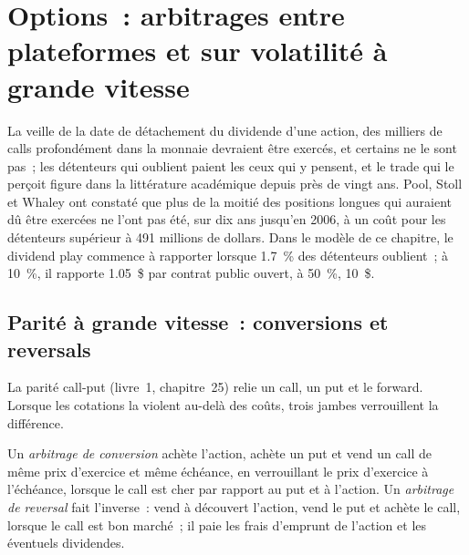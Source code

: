 \chapter{Options~: arbitrages entre plateformes et sur volatilité à grande vitesse}\label{ch:hf:options-cross-venue-and-volatility-arbitrage-at-speed}

La veille de la date de détachement du dividende d'une action, des milliers de calls profondément dans la monnaie devraient être exercés, et certains ne le sont pas~; les détenteurs qui oublient paient les
ceux qui y pensent, et le trade qui le perçoit figure dans la littérature académique depuis près de vingt ans. Pool, Stoll et Whaley ont constaté
que plus de la moitié des positions longues qui auraient dû être exercées ne l'ont pas été, sur dix ans jusqu'en 2006, à un coût pour les détenteurs supérieur à 491
millions de dollars. Dans le modèle de ce chapitre, le dividend play commence à rapporter lorsque 1.7~\% des détenteurs oublient~; à 10~\%, il rapporte 1.05~\$ par contrat public ouvert,
à 50~\%, 10~\$.

\section{Parité à grande vitesse~: conversions et reversals}

La parité call-put (livre~1, chapitre~25) relie un call, un put et le forward. Lorsque les cotations la violent au-delà des coûts, trois jambes verrouillent la différence.

\begin{definition}\label{def:hf:options-cross-venue-and-volatility-arbitrage-at-speed:conversion}
Un \emph{arbitrage de conversion} achète l'action, achète un put et vend un call de même prix d'exercice et même échéance, en verrouillant le
prix d'exercice à l'échéance, lorsque le call est cher par rapport au put et à l'action. Un \emph{arbitrage de reversal} fait l'inverse~:
vend à découvert l'action, vend le put et achète le call, lorsque le call est bon marché~; il paie les frais d'emprunt de l'action et les éventuels dividendes.
\end{definition}

